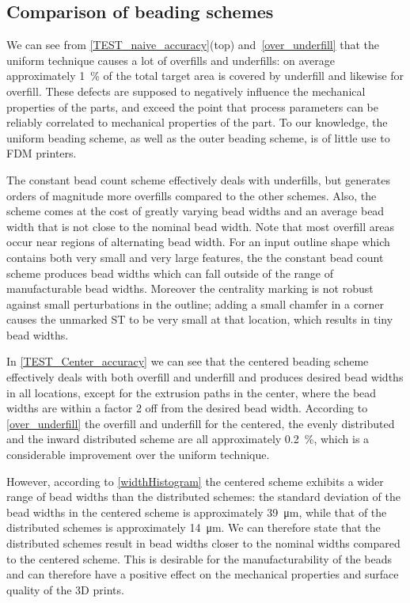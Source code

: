 

\subsection{Comparison of beading schemes}
We can see from \cref{TEST_naive_accuracy}(top) and~\ref{over_underfill} that the uniform technique causes a lot of overfills and underfills: on average approximately \SI{1}{\percent} of the total target area is covered by underfill and likewise for overfill.
These defects are supposed to negatively influence the mechanical properties of the parts, and exceed the point that process parameters can be reliably correlated to mechanical properties of the part. 
To our knowledge, the uniform beading scheme, as well as the outer beading scheme, is of little use to FDM printers.

The constant bead count scheme effectively deals with underfills, but generates orders of magnitude more overfills compared to the other schemes. 
Also, the scheme comes at the cost of greatly varying bead widths and an average bead width that is not close to the nominal bead width.
Note that most overfill areas occur near regions of alternating bead width. 
For an input outline shape which contains both very small and very large features, the the constant bead count scheme produces bead widths which can fall outside of the range of manufacturable bead widths.
Moreover the centrality marking is not robust against small perturbations in the outline; adding a small chamfer in a corner causes the unmarked ST to be very small at that location, which results in tiny bead widths.

In \cref{TEST_Center_accuracy} we can see that
the centered beading scheme effectively deals with both overfill and underfill and produces desired bead widths in all locations, except for the extrusion paths in the center, where the bead widths are within a factor 2 off from the desired bead width.
According to \cref{over_underfill} the overfill and underfill for the centered, the evenly distributed and the inward distributed scheme are all approximately \SI{0.2}{\percent}, which is a considerable improvement over the uniform technique.

However, according to \cref{widthHistogram} the centered scheme exhibits a wider range of bead widths than the distributed schemes:
the standard deviation of the bead widths in the centered scheme is approximately \SI{39}{\micro\meter}, while that of the distributed schemes is approximately \SI{14}{\micro\meter}.
We can therefore state that the distributed schemes result in bead widths closer to the nominal widths compared to the centered scheme.
This is desirable for the manufacturability of the beads and can therefore have a positive effect on the mechanical properties and surface quality of the 3D prints. 

